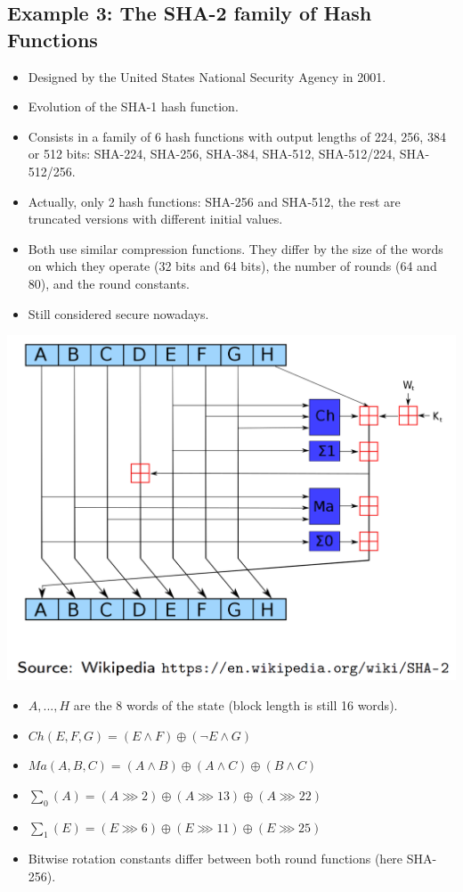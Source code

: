	\subsection{Example 3: The SHA-2 family of Hash Functions}
		\begin{itemize}
			\item Designed by the United States National Security Agency in 2001.
			\item Evolution of the SHA-1 hash function.
			\item Consists in a family of 6 hash functions with output lengths of 224, 256, 384 or 512 bits: SHA-224, SHA-256, SHA-384, SHA-512, SHA-512/224, SHA-512/256.
			\item Actually, only 2 hash functions: SHA-256 and SHA-512, the rest are truncated versions with different initial values.
			\item Both use similar compression functions. They differ by the size of the words on which they operate (32 bits and 64 bits), the number of rounds (64 and 80), and the round constants.
			\item Still considered secure nowadays.
		\end{itemize}
	   	\begin{center}
			\includegraphics[width=140mm]{Graphics/Hash Functions/hf9.png}
		\end{center}
		\begin{itemize}
			\item $A,...,H$ are the 8 words of the state (block length is still 16 words).
			\item $Ch(E,F,G) = (E \wedge F) \oplus (\neg E \wedge G)$
			\item $Ma(A,B,C) = (A \wedge B) \oplus (A \wedge C) \oplus (B \wedge C)$
			\item $\sum_0(A) = (A \ggg 2) \oplus (A \ggg 13) \oplus (A \ggg 22)$
			\item $\sum_1(E) = (E \ggg 6) \oplus (E \ggg 11) \oplus (E \ggg 25)$
			\item Bitwise rotation constants differ between both round functions (here SHA-256).
		\end{itemize}
	
